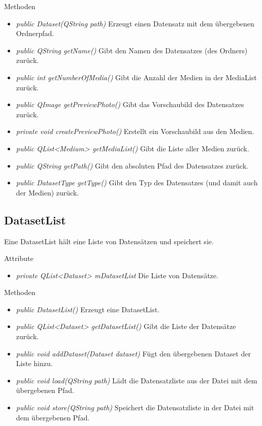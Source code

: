 Methoden
\begin{itemize}
\item \textit{public Dataset(QString path)} Erzeugt einen Datensatz mit dem übergebenen Ordnerpfad.
\item \textit{public QString getName()} Gibt den Namen des Datensatzes (des Ordners) zurück.
\item \textit{public int getNumberOfMedia()} Gibt die Anzahl der Medien in der MediaList zurück.
\item \textit{public QImage getPreviewPhoto()} Gibt das Vorschaubild des Datensatzes zurück.
\item \textit{private void createPreviewPhoto()} Erstellt ein Vorschaubild aus den Medien.
\item \textit{public QList<Medium> getMediaList()} Gibt die Liste aller Medien zurück.
\item \textit{public QString getPath()} Gibt den absoluten Pfad des Datensatzes zurück.
\item \textit{public DatasetType getType()} Gibt den Typ des Datensatzes (und damit auch der Medien) zurück.
\end{itemize}

\subsection*{DatasetList}
Eine DatasetList hält eine Liste von Datensätzen und speichert sie.

Attribute
\begin{itemize}
\item\textit{private QList<Dataset> mDatasetList} Die Liste von Datensätze.
\end{itemize}

Methoden
\begin{itemize}
\item \textit{public DatasetList()} Erzeugt eine DatasetList.
\item \textit{public QList<Dataset> getDatasetList()} Gibt die Liste der Datensätze zurück.
\item \textit{public void addDataset(Dataset dataset)} Fügt den übergebenen Dataset der Liste hinzu.
\item \textit{public void load(QString path)} Lädt die Datensatzliste aus der Datei mit dem übergebenen Pfad.
\item \textit{public void store(QString path)} Speichert die Datensatzliste in der Datei mit dem übergebenen Pfad.
\end{itemize}


